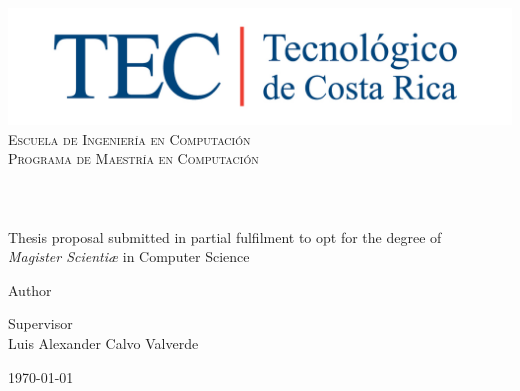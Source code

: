 \begin{titlepage}

\begin{center}

\vfill


\includegraphics[width=1\textwidth]{../images/TECRGB.jpg}
\\[0.2cm]
\textcolor{tecblue}{
\textsc{\LARGE Escuela de Ingeniería en Computación}\\[0.2cm]
\textsc{\large Programa de Maestría en Computación}\\
}
\vfill
\HRule
\\[0.9cm]
\doublespacing
{ \huge \bfseries \thesistitle}
\\[0.4cm]
\singlespacing
\HRule
\\[0.9cm]

{\large Thesis proposal submitted in partial fulfilment to opt for the degree of 
\\[1cm]
\textit{Magister Scientiæ} in Computer Science}
\\
\vfill
 
\begin{minipage}{0.45\textwidth}
\begin{flushleft} \large
Author\\
\pdfauthor 
\end{flushleft}
\end{minipage}
\begin{minipage}{0.50\textwidth}
\begin{flushright} \large
Supervisor\\
{Luis Alexander Calvo Valverde}
\end{flushright}
\end{minipage}
 
 
\vfill
 
{\large \today \\}  \hfill{} 


\end{center}
\end{titlepage}

